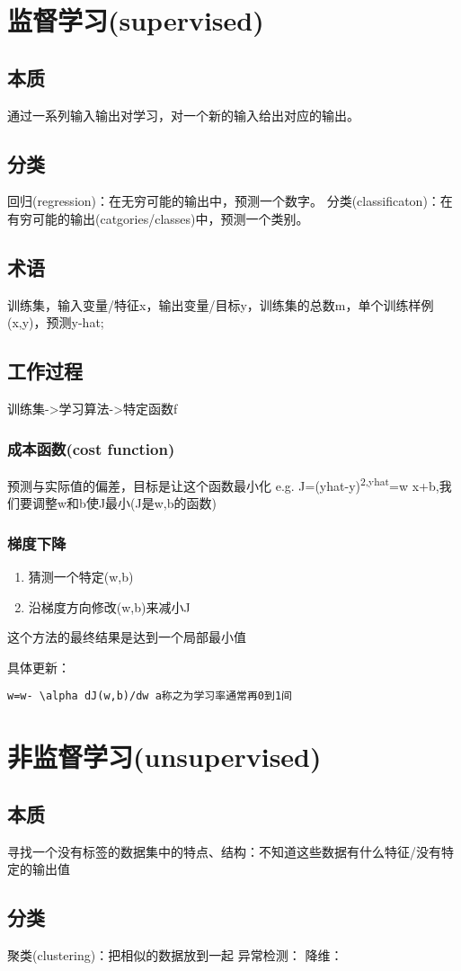 \documentclass[11pt]{article}
\date{\today}
\title{}
\begin{document}
\tableofcontents

\section{监督学习(supervised)}
\label{sec:org43d314c}
\subsection{本质}
\label{sec:org96bb732}
通过一系列输入输出对学习，对一个新的输入给出对应的输出。
\subsection{分类}
\label{sec:orgbe6a7cc}
回归(regression)：在无穷可能的输出中，预测一个数字。
分类(classificaton)：在有穷可能的输出(catgories/classes)中，预测一个类别。
\subsection{术语}
\label{sec:org8f0a839}
训练集，输入变量/特征x，输出变量/目标y，训练集的总数m，单个训练样例(x,y)，预测y-hat;
\subsection{工作过程}
\label{sec:orgfcc5d22}
训练集->学习算法->特定函数f
\subsubsection{成本函数(cost function)}
\label{sec:org67fd8b7}
预测与实际值的偏差，目标是让这个函数最小化
e.g. J=(yhat-y)\textsuperscript{2,yhat}=w x+b,我们要调整w和b使J最小(J是w,b的函数)
\subsubsection{梯度下降}
\label{sec:org545e0e0}
\begin{enumerate}
\item 猜测一个特定(w,b)
\item 沿梯度方向修改(w,b)来减小J
\end{enumerate}
这个方法的最终结果是达到一个局部最小值

具体更新：
\begin{verbatim}
w=w- \alpha dJ(w,b)/dw a称之为学习率通常再0到1间
\end{verbatim}
\section{非监督学习(unsupervised)}
\label{sec:org3ff3866}
\subsection{本质}
\label{sec:org777354c}
寻找一个没有标签的数据集中的特点、结构：不知道这些数据有什么特征/没有特定的输出值
\subsection{分类}
\label{sec:org1906c2e}
聚类(clustering)：把相似的数据放到一起
异常检测：
降维：
\end{document}
